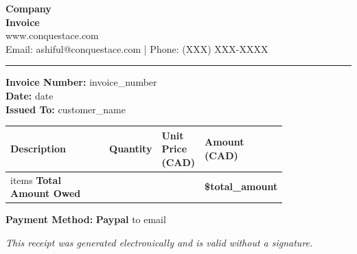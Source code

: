 \documentclass[10pt,a4paper]{article}
\begin{document}
\begin{center}
    \Huge \textbf{Company} \\[5pt]
    \large \textbf{Invoice} \\[5pt]
    \normalsize
    www.conquestace.com \\
    Email: ashiful@conquestace.com | Phone: (XXX) XXX-XXXX \\[10pt]
    \hrule
\end{center}

\begin{flushleft}
    \textbf{Invoice Number:} {{invoice_number}} \\
    \textbf{Date:} {{date}} \\
    \textbf{Issued To:} {{customer_name}} \\
\end{flushleft}

\vspace{10pt}
\renewcommand{\arraystretch}{1.5}
\begin{tabular}{|p{0.4\linewidth}|p{0.1\linewidth}|p{0.15\linewidth}|p{0.15\linewidth}|}
\hline
\textbf{Description} & \textbf{Quantity} & \textbf{Unit Price (CAD)} & \textbf{Amount (CAD)} \\
\hline
{{items}}
\textbf{Total Amount Owed} & & & \textbf{\${{total_amount}}} \\
\hline
\end{tabular}

\vspace{20pt}
\textbf{Payment Method:} \textbf{Paypal} to email \\

\vfill
\begin{center}
    \textit{This receipt was generated electronically and is valid without a signature.}
\end{center}
\end{document}
